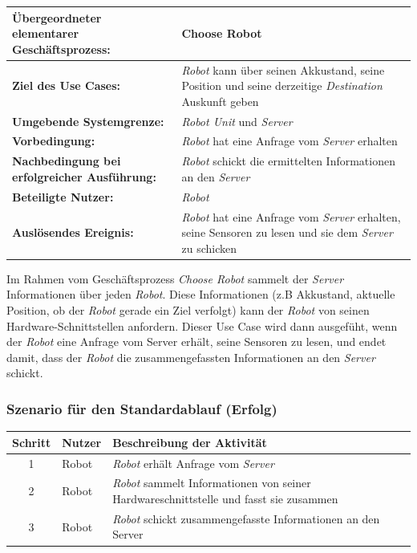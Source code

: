 				\begin{table}[H]
					\centering
					\begin{tabularx}{\textwidth}{|p{5cm}|X|}
						\hline
						\textbf{Übergeordneter elementarer Geschäftsprozess:} & Choose Robot\\ \hline
						\textbf{Ziel des Use Cases:} & \emph{Robot} kann über seinen Akkustand, seine Position und seine derzeitige \emph{Destination} Auskunft geben\\ \hline
						\textbf{Umgebende Systemgrenze:} & \emph{Robot Unit} und \emph{Server} \\ \hline
						\textbf{Vorbedingung:} & \emph{Robot} hat eine Anfrage vom \emph{Server} erhalten \\ \hline
						\textbf{Nachbedingung bei erfolgreicher Ausführung:} & \emph{Robot} schickt die ermittelten Informationen an den \emph{Server} \\ \hline
						\textbf{Beteiligte Nutzer:} & \emph{Robot} \\ \hline
						\textbf{Auslösendes Ereignis:} & \emph{Robot} hat eine Anfrage vom \emph{Server} erhalten, seine Sensoren zu lesen und sie dem \emph{Server} zu schicken \\
						\hline
					\end{tabularx}
				\end{table}
				
				Im Rahmen vom Geschäftsprozess \emph{Choose Robot} sammelt der \emph{Server}
				Informationen über jeden \emph{Robot}. Diese Informationen (z.B
				Akkustand, aktuelle Position, ob der \emph{Robot} gerade ein Ziel verfolgt)
				kann der \emph{Robot} von seinen Hardware-Schnittstellen anfordern. Dieser
				Use Case wird dann ausgefüht, wenn der \emph{Robot} eine Anfrage vom
				Server erhält, seine Sensoren zu lesen, und endet damit, dass der \emph{Robot}
				die zusammengefassten Informationen an den \emph{Server} schickt.
				
				\subsubsection*{Szenario für den Standardablauf (Erfolg)}
				
				\begin{table}[H]
					\centering
					\begin{tabularx}{\textwidth}{|c|p{2cm}|X|}
						\hline
						Schritt & Nutzer & Beschreibung der Aktivität \\ \hline
						1 & Robot & \emph{Robot} erhält Anfrage vom \emph{Server} \\
						2 & Robot & \emph{Robot} sammelt Informationen von seiner Hardwareschnittstelle und fasst sie zusammen \\
						3 & Robot & \emph{Robot} schickt zusammengefasste Informationen an den Server \\
						\hline
					\end{tabularx}
				\end{table}
				
